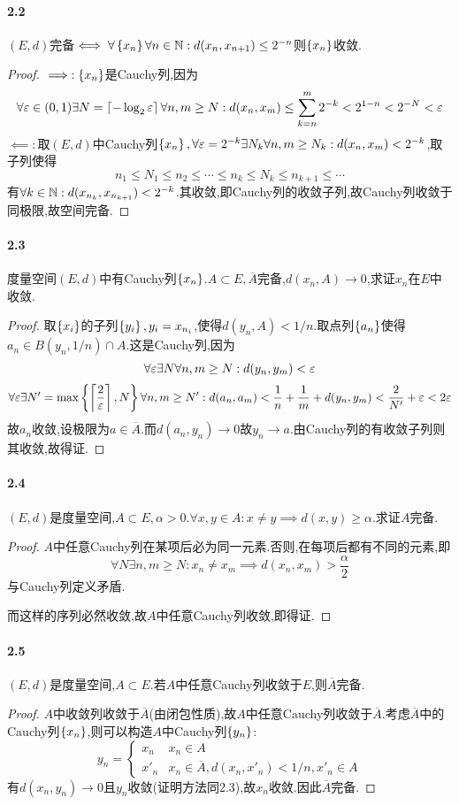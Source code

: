 \documentclass[UTF8]{article}
\begin{document}
\paragraph*{2.2} $(E,d)$完备$\iff \forall\left\{x_n\right\}\forall n\in \mathbb{N}:d(x_n,x_{n+1})\leq 2^{-n}$则$\left\{x_n\right\}$收敛.
\begin{proof}
    $\implies:\left\{x_n\right\}$是Cauchy列,因为$$\forall \varepsilon\in (0,1) \exists N=\left\lceil-\log_2 \varepsilon\right\rceil\forall n,m\geq N: d(x_n,x_m)\leq \sum_{k=n}^m 2^{-k}< 2^{1-n}<2^{-N}<\varepsilon$$
    $\impliedby:$取$(E,d)$中Cauchy列$\left\{x_n\right\},\forall \varepsilon=2^{-k}\exists N_k\forall n,m\geq N_k:d(x_n,x_m)<2^{-k}$,取子列使得$$n_1\leq N_1\leq n_2\leq \cdots \leq n_k\leq N_k\leq n_{k+1}\leq \cdots$$
    有$\forall k\in \mathbb{N}:d(x_{n_k},x_{n_{k+1}})<2^{-k}$.其收敛,即Cauchy列的收敛子列,故Cauchy列收敛于同极限,故空间完备.
\end{proof}

\paragraph*{2.3}度量空间$(E,d)$中有Cauchy列$\left\{x_n\right\}$.$A\subset E, \overline{A}$完备,$d(x_n,A)\to 0$,求证$x_n$在$E$中收敛.
\begin{proof}
    取$\left\{x_i\right\}$的子列$\left\{y_i\right\},y_i=x_{n_i}$,使得$d(y_n,A)<1/n$.取点列$\left\{a_n\right\}$使得$a_n\in B(y_n,1/n)\cap A$.这是Cauchy列,因为
    $$\forall \varepsilon \exists N\forall n,m\geq N:d(y_n,y_m)<\varepsilon$$
    $$\forall \varepsilon\exists N'=\max\left\{\left\lceil\frac{2}{\varepsilon}\right\rceil,N\right\}\forall n,m\geq N': d(a_n,a_m)<\frac{1}{n}+\frac{1}{m}+d(y_n,y_m)<\frac{2}{N'}+\varepsilon<2\varepsilon$$
    故$a_n$收敛,设极限为$a\in \overline{A}$.而$d(a_n,y_n)\to 0$故$y_n\to a$.由Cauchy列的有收敛子列则其收敛,故得证.
\end{proof}

\paragraph*{2.4}$(E,d)$是度量空间,$A\subset E,\alpha>0.\forall x,y\in A:x\neq y\implies d(x,y)\geq \alpha$.求证$A$完备.
\begin{proof}
    $A$中任意Cauchy列在某项后必为同一元素.否则,在每项后都有不同的元素,即$$\forall N\exists n,m\geq N:x_n\neq x_m\implies d(x_n,x_m)>\frac{\alpha}{2}$$与Cauchy列定义矛盾.

    而这样的序列必然收敛,故$A$中任意Cauchy列收敛,即得证.
\end{proof}

\paragraph*{2.5}$(E,d)$是度量空间,$A\subset E$.若$A$中任意Cauchy列收敛于$E$,则$\overline{A}$完备.
\begin{proof}
    $A$中收敛列收敛于$\overline{A}$(由闭包性质),故$A$中任意Cauchy列收敛于$\overline{A}$.考虑$\overline{A}$中的Cauchy列$\left\{x_n\right\}$,则可以构造$A$中Cauchy列$\left\{y_n\right\}$:$$y_n=\begin{cases}
        x_n&x_n\in A\\ x'_n&x_n\in \overline{A}, d(x_n,x'_n)<1/n, x'_n\in A
    \end{cases}$$
    有$d(x_n,y_n)\to 0$且$y_n$收敛(证明方法同2.3),故$x_n$收敛.因此$\overline{A}$完备.
\end{proof}
\end{document}
